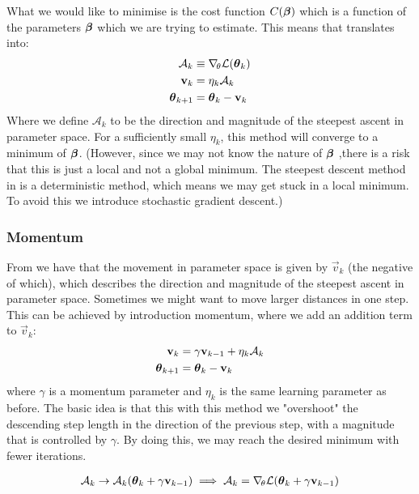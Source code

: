         What we would like to minimise is the cost function $C(\boldsymbol{\beta})$ which is a function of the parameters $\boldsymbol{\beta}$ which we are trying to estimate. This means that  translates into:
        \begin{align}\label{eq:steepest_descent_cost_function}
            \mathcal{A}_k &\equiv \nabla_{\!\theta} \mathcal{L}(\boldsymbol{\theta}_k) \nonumber \\
            \mathbf{v}_k &= \eta_k\mathcal{A}_k \nonumber \\
            \boldsymbol{\theta}_{k+1} &= \boldsymbol{\theta}_k - \mathbf{v}_k
        \end{align}
        Where we define $\mathcal{A}_k$ to be the direction and magnitude of the steepest ascent in parameter space. 
        For a sufficiently small $\eta_k$, this method will converge to a minimum of $\boldsymbol{\beta}$. (However, since we may not know the nature of $\boldsymbol{\beta}$ ,there is a risk that this is just a local and not a global minimum. The steepest descent method in  is a deterministic method, which means we may get stuck in a local minimum. To avoid this we introduce stochastic gradient descent.) 

    \subsubsection{Momentum}\label{sec:momentum}
        From  we have that the movement in parameter space is given by $\vec{v}_k$ (the negative of which), which describes the direction and magnitude of the steepest ascent in parameter space. Sometimes we might want to move larger distances in one step. This can be achieved by introduction momentum, where we add an addition term to $\vec{v}_k$:
        \begin{align}
            \mathbf{v}_k &= \gamma\mathbf{v}_{k-1} + \eta_k\mathcal{A}_k \nonumber \\
            \boldsymbol{\theta}_{k+1} &= \boldsymbol{\theta}_k - \mathbf{v}_k
        \end{align}
        where $\gamma$ is a momentum parameter and $\eta_k$ is the same learning parameter as before. The basic idea is that this with this method we "overshoot" the descending step length in the direction of the previous step, with a magnitude that is controlled by $\gamma$. By doing this, we may reach the desired minimum with fewer iterations. 

        \begin{align}\label{eq:nag}
            \mathcal{A}_k \to \mathcal{A}_k(\boldsymbol{\theta}_k + \gamma\mathbf{v}_{k-1}) \implies \mathcal{A}_k= \nabla_{\!\theta}\mathcal{L}(\boldsymbol{\theta}_k + \gamma\mathbf{v}_{k-1})
        \end{align}

